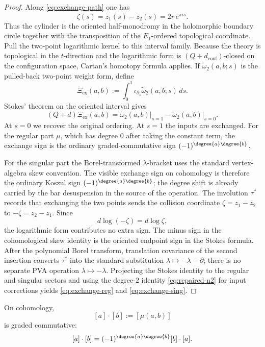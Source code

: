\begin{proof}
Along \eqref{eq:exchange-path} one has
\[
\zeta(s)=z_1(s)-z_2(s)=2r\,e^{\pi i s}.
\]
Thus the cylinder is the oriented half-monodromy in the holomorphic
boundary circle together with the transposition of the \(E_1\)-ordered
topological coordinate. Pull the two-point logarithmic kernel to this
interval family. Because the theory is topological in the \(t\)-direction
and the logarithmic form is \((Q+d_{\mathrm{conf}})\)-closed on the
configuration space, Cartan's homotopy formula applies.  If
\(\widetilde\omega_2(a,b;s)\) is the pulled-back two-point weight form,
define
\[
\Xi_{\mathrm{ex}}(a,b):=\int_0^1 \iota_{\partial_s}\widetilde\omega_2(a,b;s)\,ds.
\]
Stokes' theorem on the oriented interval gives
\[
(Q+d)\Xi_{\mathrm{ex}}(a,b)
=
\widetilde\omega_2(a,b)\big|_{s=1}
-
\widetilde\omega_2(a,b)\big|_{s=0}.
\]
At $s=0$ we recover the original ordering. At $s=1$ the inputs are exchanged.
For the regular part $\mu$, which has degree $0$ after taking the constant term,
the exchange sign is the ordinary graded-commutative sign
$(-1)^{\degree{a}\degree{b}}$.

For the singular part the Borel-transformed $\lambda$-bracket uses
the standard vertex-algebra skew convention. The visible exchange
sign on cohomology is therefore the ordinary Koszul sign
$(-1)^{\degree{a}\degree{b}}$; the degree shift is already carried by
the bar desuspension in the source of the operation. The involution
$\tau^\ast$ records that exchanging the two points sends the collision coordinate
$\zeta=z_1-z_2$ to $-\zeta=z_2-z_1$.  Since
\[
d\log(-\zeta)=d\log\zeta,
\]
the logarithmic form contributes no extra sign.  The minus sign in the
cohomological skew identity is the oriented endpoint sign in the
Stokes formula.  After the polynomial Borel transform, translation
covariance of the second insertion converts \(\tau^\ast\) into the
standard substitution \(\lambda\mapsto-\lambda-\partial\); there is no
separate PVA operation \(\lambda\mapsto-\lambda\).
Projecting the Stokes identity to the regular and singular sectors and
using the degree-\(2\) identity \eqref{eq:repaired-n2} for input
corrections yields \eqref{eq:exchange-reg} and \eqref{eq:exchange-sing}.
\end{proof}

\begin{proposition}
\label{prop:product-commutative}
On cohomology,
\[
[a]\cdot[b]:=[\mu(a,b)]
\]
is graded commutative:
\[
[a]\cdot[b]=(-1)^{\degree{a}\degree{b}}[b]\cdot[a].
\]
\end{proposition}


